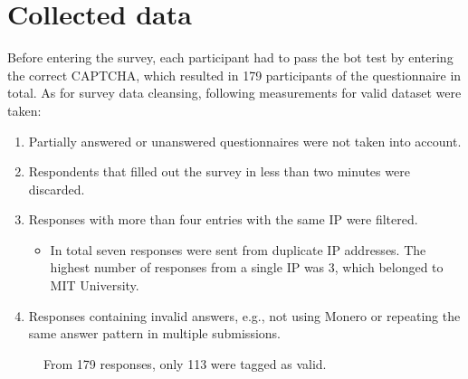\documentclass[
  printed, %
  table,   %
  lof,     %
  lot,     %
           oneside, color
]{fithesis3}
\begin{document}
\section{Collected data}
Before entering the survey, each participant had to pass the bot test by entering the correct CAPTCHA, which resulted in 179 participants of the questionnaire in total. As for survey data cleansing, following measurements for valid dataset were taken:
\begin{enumerate}
\itemsep0em
\item Partially answered or unanswered questionnaires were not taken into account. 
\item Respondents that filled out the survey in less than two minutes were discarded.
\item Responses with more than four entries with the same IP were filtered.
\begin{itemize}
\item In total seven responses were sent from duplicate IP addresses. The highest number of responses from a single IP was 3, which belonged to MIT University.
\end{itemize}
\item Responses containing invalid answers, e.g., not using Monero or repeating the same answer pattern in multiple submissions.

\end{enumerate}
\begin{center}
\begin{figure}[H]
\caption{From 179 responses, only 113 were tagged as valid.}
\label{chart:price}\end{figure}\end{center}
\end{document}

